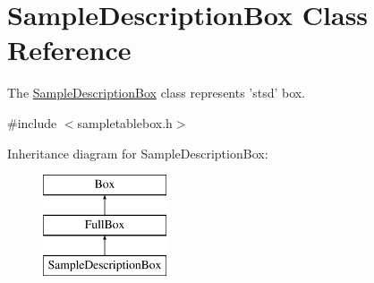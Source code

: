 \hypertarget{class_sample_description_box}{\section{Sample\-Description\-Box Class Reference}
\label{class_sample_description_box}
}


The \hyperlink{class_sample_description_box}{Sample\-Description\-Box} class represents 'stsd' box.  




{\ttfamily \#include $<$sampletablebox.\-h$>$}

Inheritance diagram for Sample\-Description\-Box\-:\begin{figure}[H]
\begin{center}
\leavevmode
\includegraphics[height=3.000000cm]{class_sample_description_box}
\end{center}
\end{figure}
